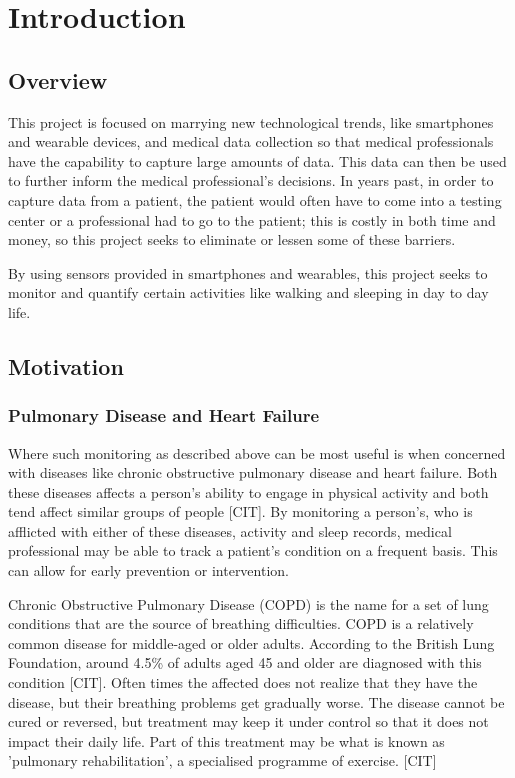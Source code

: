 \part{Introduction}

    \chapter{Overview}

        This project is focused on marrying new technological trends, like smartphones and wearable devices, and medical data collection so that medical professionals have the capability to capture large amounts of data. This data can then be used to further inform the medical professional's decisions. In years past, in order to capture data from a patient, the patient would often have to come into a testing center or a professional had to go to the patient; this is costly in both time and money, so this project seeks to eliminate or lessen some of these barriers. 

        By using sensors provided in smartphones and wearables, this project seeks to monitor and quantify certain activities like walking and sleeping in day to day life.

    \chapter{Motivation}

        \section{Pulmonary Disease and Heart Failure}

            Where such monitoring as described above can be most useful is when concerned with diseases like chronic obstructive pulmonary disease and heart failure. Both these diseases affects a person's ability to engage in physical activity and both tend affect similar groups of people [CIT]. By monitoring a person's, who is afflicted with either of these diseases, activity and sleep records, medical professional may be able to track a patient's condition on a frequent basis. This can allow for early prevention or intervention.

            Chronic Obstructive Pulmonary Disease (COPD) is the name for a set of lung conditions that are the source of breathing difficulties. COPD is a relatively common disease for middle-aged or older adults. According to the British Lung Foundation, around 4.5\% of adults aged 45 and older are diagnosed with this condition [CIT]. Often times the affected does not realize that they have the disease, but their breathing problems get gradually worse. The disease cannot be cured or reversed, but treatment may keep it under control so that it does not impact their daily life. Part of this treatment may be what is known as 'pulmonary rehabilitation', a specialised programme of exercise. [CIT]

